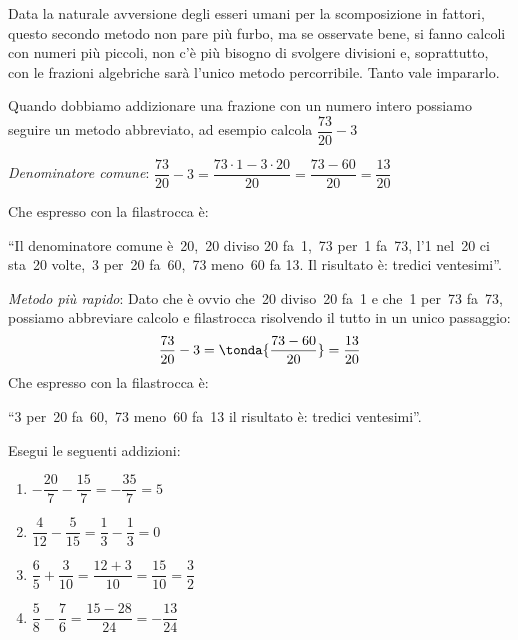 \begin{osservazione}{}{}
 Data la naturale avversione degli esseri umani per la scomposizione in 
fattori, questo secondo metodo non pare più furbo, ma se osservate bene, si 
fanno calcoli con numeri più piccoli, non c'è più bisogno di svolgere 
divisioni e, soprattutto, con le frazioni algebriche sarà l'unico metodo 
percorribile. Tanto vale impararlo.
\end{osservazione}

\begin{esempio}{}{}
 Quando dobbiamo addizionare una frazione con un numero intero possiamo 
seguire un metodo abbreviato, ad esempio calcola 
\(\dfrac{73}{20} - 3\)

\emph{Denominatore comune}:
\(\dfrac{73}{20} - 3 = \dfrac{73 \cdot 1 - 3 \cdot 20}{20} =
  \dfrac{73 - 60}{20} = \dfrac{13}{20}\)

Che espresso con la filastrocca è: 

``Il denominatore comune è~20,~20 diviso 20 fa~1,~73 per~1 fa~73, 
l'1 nel~20 ci sta~20 volte,~3 per~20 fa~60,~73 meno~60 fa 13.
Il risultato è: tredici ventesimi''.

\emph{Metodo più rapido}:
Dato che è ovvio che~20 diviso~20 fa~1 e che~1 per~73 fa~73, 
possiamo abbreviare calcolo e filastrocca risolvendo il tutto in un unico 
passaggio:
\[\dfrac{73}{20} - 3 = \tonda{\dfrac{73 - 60}{20}} = \dfrac{13}{20}\]
Che espresso con la filastrocca è: 

``3 per~20 fa~60,~73 meno~60 fa~13 il risultato è: tredici ventesimi''.
\end{esempio}

\begin{esempio}{}{}
 Esegui le seguenti addizioni:
 \begin{multicols}{2}
 \begin{enumerate} [noitemsep]
  \item \(-\dfrac{20}{7} -\dfrac{15}{7} = -\dfrac{35}{7} = 5\)
  \item \(\dfrac{4}{12} - \dfrac{5}{15} = \dfrac{1}{3} - \dfrac{1}{3} = 0\)
  \item \(\dfrac{6}{5} + \dfrac{3}{10} = \dfrac{12 + 3}{10} = 
          \dfrac{15}{10} = \dfrac{3}{2}\)
  \item \(\dfrac{5}{8} - \dfrac{7}{6} = \dfrac{15 - 28}{24} = 
          -\dfrac{13}{24}\)
 \end{enumerate}
 \end{multicols}
\end{esempio}

